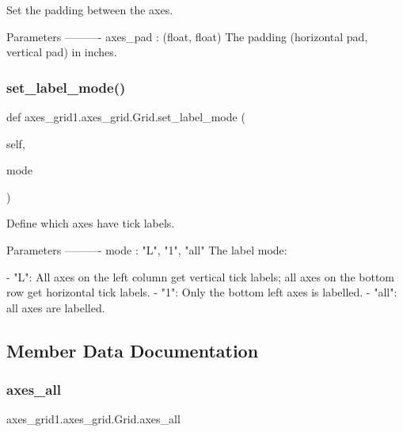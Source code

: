 \begin{DoxyVerb}Set the padding between the axes.

Parameters
----------
axes_pad : (float, float)
    The padding (horizontal pad, vertical pad) in inches.
\end{DoxyVerb}
 \mbox{\label{classaxes__grid1_1_1axes__grid_1_1Grid_a543d9f62735ef651e376c890748b2344}} 
\subsubsection{\texorpdfstring{set\+\_\+label\+\_\+mode()}{set\_label\_mode()}}
{\footnotesize\ttfamily def axes\+\_\+grid1.\+axes\+\_\+grid.\+Grid.\+set\+\_\+label\+\_\+mode (\begin{DoxyParamCaption}\item[{}]{self,  }\item[{}]{mode }\end{DoxyParamCaption})}

\begin{DoxyVerb}Define which axes have tick labels.

Parameters
----------
mode : {"L", "1", "all"}
    The label mode:

    - "L": All axes on the left column get vertical tick labels;
      all axes on the bottom row get horizontal tick labels.
    - "1": Only the bottom left axes is labelled.
    - "all": all axes are labelled.
\end{DoxyVerb}
 

\subsection{Member Data Documentation}
\mbox{\label{classaxes__grid1_1_1axes__grid_1_1Grid_a665d3a668cf5e79dcdeb990e02d10626}} 
\subsubsection{\texorpdfstring{axes\+\_\+all}{axes\_all}}
{\footnotesize\ttfamily axes\+\_\+grid1.\+axes\+\_\+grid.\+Grid.\+axes\+\_\+all}

